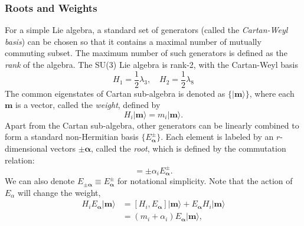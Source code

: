 \subsubsection{Roots and Weights}
For a simple Lie algebra, a standard set of generators (called the \textit{Cartan-Weyl basis}) can be chosen so that it contains a maximal number of mutually commuting subset.
The maximum number of such generators is defined as the \textit{rank} of the algebra.
The SU(3) Lie algebra is rank-2, with the Cartan-Weyl basis
\begin{equation}
	H_1 = \frac{1}{2}\lambda_3, \quad H_2 = \frac{1}{2}\lambda_8
\end{equation}
The common eigenstates of Cartan sub-algebra is denoted as $\{|\bm m\rangle\}$, where each $\bm m$ is a vector, called the \textit{weight}, defined by
\begin{equation}
	H_i |\bm m\rangle = m_i |\bm m\rangle.
\end{equation}
Apart from the Cartan sub-algebra, other generators can be linearly combined to form a standard non-Hermitian basis $\{E^\pm_{\bm \alpha}\}$.
Each element is labeled by an $r$-dimensional vectors $\pm \bm\alpha$, called the \textit{root}, which is defined by the commutation relation:
\begin{equation}
	[H_i, E_{\bm \alpha}^\pm] = \pm \alpha_i E^\pm_{\bm \alpha}.
\end{equation}
We can also denote $E_{\pm\bm{\alpha}} \equiv E_{\bm{\alpha}}^\pm$ for notational simplicity.
Note that the action of $E_\alpha$ will change the weight,
\begin{equation}
\begin{aligned}
	H_i E_{\bm \alpha}|\bm m\rangle 
	&= [H_i, E_{\bm \alpha}]|\bm m\rangle + E_{\bm \alpha} H_i |\bm m\rangle \\
	&= (m_i + \alpha_i) E_{\bm \alpha}|\bm m\rangle,
\end{aligned}
\end{equation}

